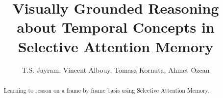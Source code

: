 \documentclass{article}
\title{Visually Grounded Reasoning about Temporal Concepts in Selective Attention Memory}
\author{T.S. Jayram, Vincent Albouy, Tomasz Kornuta, Ahmet Ozcan}
\theoremstyle{remark}
\theoremstyle{definition}
\begin{document}
\maketitle
\begin{abstract}
	Learning to reason on a frame by frame basis using Selective Attention Memory. 
\end{abstract}
	

	












\newpage



\newpage

\end{document}
